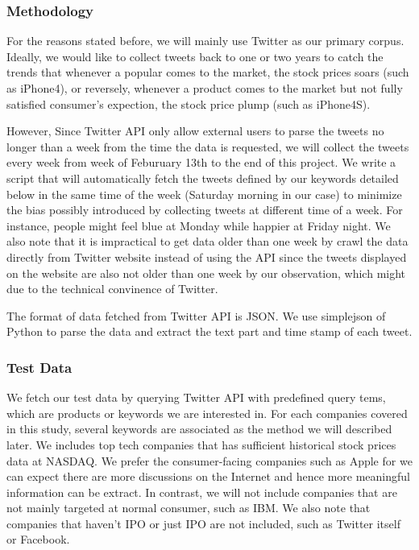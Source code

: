 \documentclass[12pt]{article}
\begin{document}
\subsubsection{Methodology}
For the reasons stated before, we will mainly use Twitter as our primary corpus. Ideally, we would like to collect tweets back to one or two years to catch the trends that whenever a popular comes to the market, the stock prices soars (such as iPhone4), or reversely, whenever a product comes to the market but not fully satisfied consumer's expection, the stock price plump (such as iPhone4S). 

However, Since Twitter API only allow external users to parse the tweets no longer than a week from the time the data is requested, we will collect the tweets every week from week of Feburuary 13th to the end of this project. We write a script that will automatically fetch the tweets defined by our keywords detailed below in the same time of the week (Saturday morning in our case) to minimize the bias possibly introduced by collecting tweets at different time of a week. For instance, people might feel blue at Monday while happier at Friday night. We also note that it is impractical to get data older than one week by crawl the data directly from Twitter website instead of using the API since the tweets displayed on the website are also not older than one week by our observation, which might due to the technical convinence of Twitter.

The format of data fetched from Twitter API is JSON. We use simplejson of Python to parse the data and extract the text part and time stamp of each tweet.

\subsubsection{Test Data}
We fetch our test data by querying Twitter API with predefined query tems, which are products or keywords we are interested in. For each companies covered in this study, several keywords are associated as the method we will described later. We includes top tech companies that has sufficient historical stock prices data at NASDAQ. We prefer the consumer-facing companies such as Apple for we can expect there are more discussions on the Internet and hence more meaningful information can be extract. In contrast, we will not include companies that are not mainly targeted at normal consumer, such as IBM. We also note that companies that haven't IPO or just IPO are not included, such as Twitter itself or Facebook.
\end{document}
